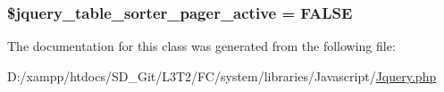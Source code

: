 \subsubsection[{\$jquery\+\_\+table\+\_\+sorter\+\_\+pager\+\_\+active}]{\setlength{\rightskip}{0pt plus 5cm}\$jquery\+\_\+table\+\_\+sorter\+\_\+pager\+\_\+active = F\+A\+L\+S\+E}\label{class_c_i___jquery_a43cc145aba3c11e907fb4245f23bc44e}


The documentation for this class was generated from the following file\+:\begin{DoxyCompactItemize}
\item 
D\+:/xampp/htdocs/\+S\+D\+\_\+\+Git/\+L3\+T2/\+F\+C/system/libraries/\+Javascript/\hyperlink{_jquery_8php}{Jquery.\+php}\end{DoxyCompactItemize}
